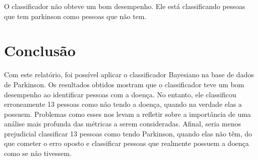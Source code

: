 \documentclass{article}
\begin{document}
O classificador não obteve um bom desempenho. Ele está classificando pessoas que tem parkinson como pessoas que não tem.

\section{Conclusão}

Com este relatório, foi possível aplicar o classificador Bayesiano na base de dados de Parkinson. Os resultados obtidos mostram que o classificador teve um bom desempenho ao identificar pessoas com a doença. No entanto, ele classificou erroneamente 13 pessoas como não tendo a doença, quando na verdade elas a possuem. Problemas como esses nos levam a refletir sobre a importância de uma análise mais profunda das métricas a serem consideradas. Afinal, seria menos prejudicial classificar 13 pessoas como tendo Parkinson, quando elas não têm, do que cometer o erro oposto e classificar pessoas que realmente possuem a doença como se não tivessem.
\end{document}
